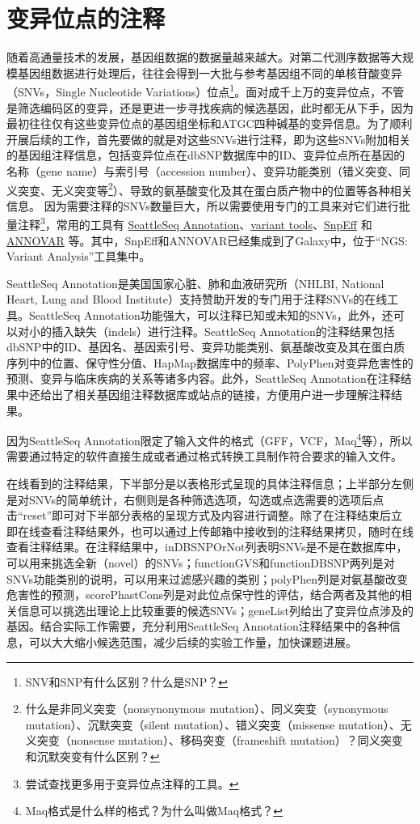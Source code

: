 \documentclass[11pt,a4paper,twoside]{book}
\begin{document}
\section{变异位点的注释}
随着高通量技术的发展，基因组数据的数据量越来越大。对第二代测序数据等大规模基因组数据进行处理后，往往会得到一大批与参考基因组不同的单核苷酸变异（SNVs，Single Nucleotide Variations）位点\footnote{SNV和SNP有什么区别？什么是SNP？}。面对成千上万的变异位点，不管是筛选编码区的变异，还是更进一步寻找疾病的候选基因，此时都无从下手，因为最初往往仅有这些变异位点的基因组坐标和ATGC四种碱基的变异信息。为了顺利开展后续的工作，首先要做的就是对这些SNVs进行注释，即为这些SNVs附加相关的基因组注释信息，包括变异位点在dbSNP数据库中的ID、变异位点所在基因的名称（gene name）与索引号（accession number）、变异功能类别（错义突变、同义突变、无义突变等\footnote{什么是非同义突变（nonsynonymous mutation）、同义突变（synonymous mutation）、沉默突变（silent mutation）、错义突变（missense mutation）、无义突变（nonsense mutation）、移码突变（frameshift mutation）？同义突变和沉默突变有什么区别？}）、导致的氨基酸变化及其在蛋白质产物中的位置等各种相关信息。 因为需要注释的SNVs数量巨大，所以需要使用专门的工具来对它们进行批量注释\footnote{尝试查找更多用于变异位点注释的工具。}，常用的工具有 \href{http://snp.gs.washington.edu/SeattleSeqAnnotation137/index.jsp}{SeattleSeq Annotation}、\href{http://varianttools.sourceforge.net}{variant tools}、\href{http://snpeff.sourceforge.net}{SnpEff} 和 \href{http://annovar.openbioinformatics.org}{ANNOVAR} 等。其中，SnpEff和ANNOVAR已经集成到了Galaxy中，位于“NGS: Variant Analysis”工具集中。

SeattleSeq Annotation是美国国家心脏、肺和血液研究所（NHLBI, National Heart, Lung and Blood Institute）支持赞助开发的专门用于注释SNVs的在线工具。SeattleSeq Annotation功能强大，可以注释已知或未知的SNVs，此外，还可以对小的插入缺失（indels）进行注释。SeattleSeq Annotation的注释结果包括dbSNP中的ID、基因名、基因索引号、变异功能类别、氨基酸改变及其在蛋白质序列中的位置、保守性分值、HapMap数据库中的频率、PolyPhen对变异危害性的预测、变异与临床疾病的关系等诸多内容。此外，SeattleSeq Annotation在注释结果中还给出了相关基因组注释数据库或站点的链接，方便用户进一步理解注释结果。

因为SeattleSeq Annotation限定了输入文件的格式（GFF，VCF，Maq\footnote{Maq格式是什么样的格式？为什么叫做Maq格式？}等），所以需要通过特定的软件直接生成或者通过格式转换工具制作符合要求的输入文件。

在线看到的注释结果，下半部分是以表格形式呈现的具体注释信息；上半部分左侧是对SNVs的简单统计，右侧则是各种筛选选项，勾选或点选需要的选项后点击“reset”即可对下半部分表格的呈现方式及内容进行调整。除了在注释结束后立即在线查看注释结果外，也可以通过上传邮箱中接收到的注释结果拷贝，随时在线查看注释结果。在注释结果中，inDBSNPOrNot列表明SNVs是不是在数据库中，可以用来挑选全新（novel）的SNVs；functionGVS和functionDBSNP两列是对SNVs功能类别的说明，可以用来过滤感兴趣的类别；polyPhen列是对氨基酸改变危害性的预测，scorePhastCons列是对此位点保守性的评估，结合两者及其他的相关信息可以挑选出理论上比较重要的候选SNVs；geneList列给出了变异位点涉及的基因。结合实际工作需要，充分利用SeattleSeq Annotation注释结果中的各种信息，可以大大缩小候选范围，减少后续的实验工作量，加快课题进展。
\end{document}
